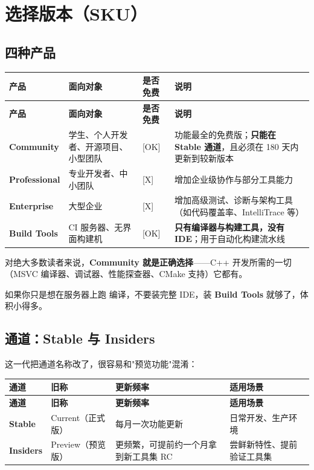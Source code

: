 \section{选择版本（SKU）}
\subsection{四种产品}
\begin{longtable}{L{2.6cm}L{4.2cm}C{1.8cm}L{5.6cm}}
\toprule
\textbf{产品} & \textbf{面向对象} & \textbf{是否免费} & \textbf{说明} \\
\midrule
\endfirsthead
\toprule
\textbf{产品} & \textbf{面向对象} & \textbf{是否免费} & \textbf{说明} \\
\midrule
\endhead
\bottomrule
\endlastfoot
\textbf{Community} & 学生、个人开发者、开源项目、小型团队 & [OK] & 功能最全的免费版；\textbf{只能在 Stable 通道}，且必须在 180 天内更新到较新版本 \\
\textbf{Professional} & 专业开发者、中小团队 & [X] & 增加企业级协作与部分工具能力 \\
\textbf{Enterprise} & 大型企业 & [X] & 增加高级测试、诊断与架构工具（如代码覆盖率、IntelliTrace 等） \\
\textbf{Build Tools} & CI 服务器、无界面构建机 & [OK] & \textbf{只有编译器与构建工具，没有 IDE}；用于自动化构建流水线 \\
\end{longtable}

对绝大多数读者来说，\textbf{Community 就是正确选择}——C++ 开发所需的一切（MSVC 编译器、调试器、性能探查器、CMake 支持）它都有。

\begin{tipbox}[提示]
如果你只是想在服务器上跑  编译，不要装完整 IDE，装 \textbf{Build Tools} 就够了，体积小得多。
\end{tipbox}

\subsection{通道：Stable 与 Insiders}
这一代把通道名称改了，很容易和"预览功能"混淆：

\begin{longtable}{L{2.4cm}L{3.2cm}L{3.4cm}L{5.2cm}}
\toprule
\textbf{通道} & \textbf{旧称} & \textbf{更新频率} & \textbf{适用场景} \\
\midrule
\endfirsthead
\toprule
\textbf{通道} & \textbf{旧称} & \textbf{更新频率} & \textbf{适用场景} \\
\midrule
\endhead
\bottomrule
\endlastfoot
\textbf{Stable} & Current（正式版） & 每月一次功能更新 & 日常开发、生产环境 \\
\textbf{Insiders} & Preview（预览版） & 更频繁，可提前约一个月拿到新工具集 RC & 尝鲜新特性、提前验证工具集 \\
\end{longtable}

